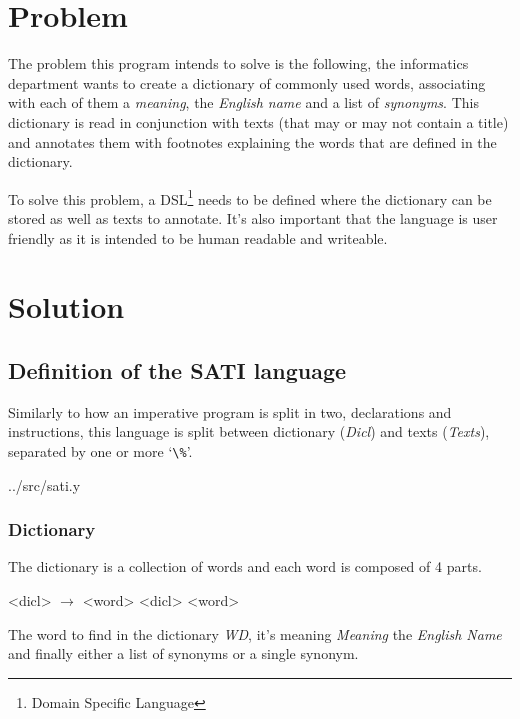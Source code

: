 \documentclass[a4paper]{report}
\begin{document}
\chapter{Problem}

The problem this program intends to solve is the following, the informatics
department wants to create a dictionary of commonly used words, associating
with each of them a \textit{meaning}, the \textit{English name} and a list of
\textit{synonyms}. This dictionary is read in conjunction with texts (that may
or may not contain a title) and annotates them with footnotes explaining the
words that are defined in the dictionary.

To solve this problem, a DSL\footnote{Domain Specific Language} needs to be
defined where the dictionary can be stored as well as texts to annotate. It's
also important that the language is user friendly as it is intended to be
human readable and writeable.

\chapter{Solution}\label{cha:solution}

\section{Definition of the SATI language}

Similarly to how an imperative
program is split in two, declarations and instructions, this language is split
between dictionary (\textit{Dicl}) and texts (\textit{Texts}), separated by one or more `\verb!\%!'.


{../src/sati.y}

\subsection{Dictionary}

The dictionary is a collection of words and each word is composed of 4 parts.

\begin{grammar}
    <dicl> $\to$ <word>
    \alt{} <dicl> <word>
\end{grammar}

The word to find in the dictionary \textit{WD}, it's meaning \textit{Meaning}
the \textit{English Name} and finally either a list of synonyms or a single
synonym.
\end{document}
